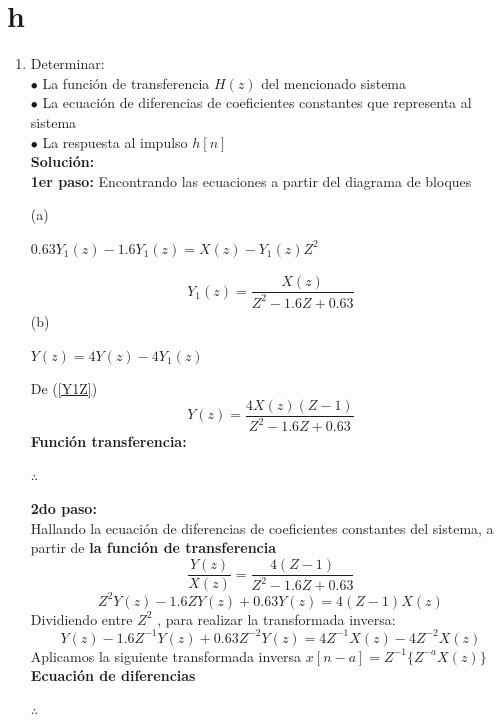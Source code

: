 \documentclass[11pt,a4paper]{article}
\begin{document}
	\section{h}{
	\large{
	\begin{enumerate}
	\item[\textbf{}]
	Determinar:\\
	$\bullet$ La función de transferencia $H(z)$ del mencionado sistema\\
	$\bullet$ La ecuación de diferencias de coeficientes constantes que representa al sistema\\
	$\bullet$ La respuesta al impulso $h[n]$\\
	\textbf{Solución:}\\
	\textbf{1er paso:}
	Encontrando las ecuaciones a partir del diagrama de bloques
	
	(a)\begin{center}
	$0.63Y_1(z)-1.6 Y_1(z) = X(z)-Y_1(z)Z^2$
	\end{center}
	\begin{eqnarray}
	\label{Y1Z}
		Y_1(z)=\dfrac{X(z)}{Z^2 - 1.6 Z+0.63}
	\end{eqnarray}
	(b)\begin{center}
	$Y(z)=4Y(z)-4Y_1(z)$
	\end{center}
	De (\ref{Y1Z})
	$$Y(z)=\dfrac{4 X(z) (Z-1)}{Z^2 - 1.6 Z+0.63}$$
	\textbf{Función transferencia:}
	\begin{center}
	$\therefore$ 
	\end{center}
    \textbf{2do paso:}\\
    Hallando la ecuación de diferencias de coeficientes constantes del sistema, a partir de \textbf{la función de transferencia}\\
    $$\dfrac{Y(z)}{X(z)}=\dfrac{4(Z-1)}{Z^2 - 1.6 Z+0.63}$$
    $$Z^2 Y(z)- 1.6 Z Y(z)+0.63 Y(z)=4(Z-1)X(z)$$
    Dividiendo entre $Z^2$ , para realizar la transformada inversa:
    $$Y(z)- 1.6 Z^{-1} Y(z)+0.63 Z^{-2} Y(z)=4 Z^{-1} X(z)-4 Z^{-2} X(z)$$
    Aplicamos la siguiente transformada inversa $x[n-a]=Z^{-1}\lbrace Z^{-a} X(z) \rbrace$\\
    \textbf{Ecuación de diferencias}
    \begin{center}
	$\therefore$ 
	\end{center}
	

\end{enumerate}}}
\end{document}
